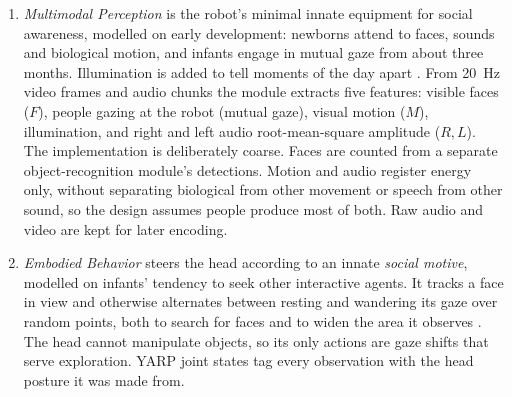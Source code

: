 \begin{enumerate}
    \item \emph{Multimodal Perception} is the robot's minimal innate equipment for social awareness, modelled on early development: newborns attend to faces, sounds and biological motion, and infants engage in mutual gaze from about three months. Illumination is added to tell moments of the day apart \citep{Pasquali2025AlwaysOn}. From 20~Hz video frames and audio chunks the module extracts five features: visible faces ($F$), people gazing at the robot (mutual gaze), visual motion ($M$), illumination, and right and left audio root-mean-square amplitude ($R, L$). The implementation is deliberately coarse. Faces are counted from a separate object-recognition module's detections. Motion and audio register energy only, without separating biological from other movement or speech from other sound, so the design assumes people produce most of both. Raw audio and video are kept for later encoding.

    \item \emph{Embodied Behavior} steers the head according to an innate \emph{social motive}, modelled on infants' tendency to seek other interactive agents. It tracks a face in view and otherwise alternates between resting and wandering its gaze over random points, both to search for faces and to widen the area it observes \citep{Pasquali2024ArtificialCognition,Pasquali2025AlwaysOn}. The head cannot manipulate objects, so its only actions are gaze shifts that serve exploration. YARP joint states tag every observation with the head posture it was made from.


\end{enumerate}

